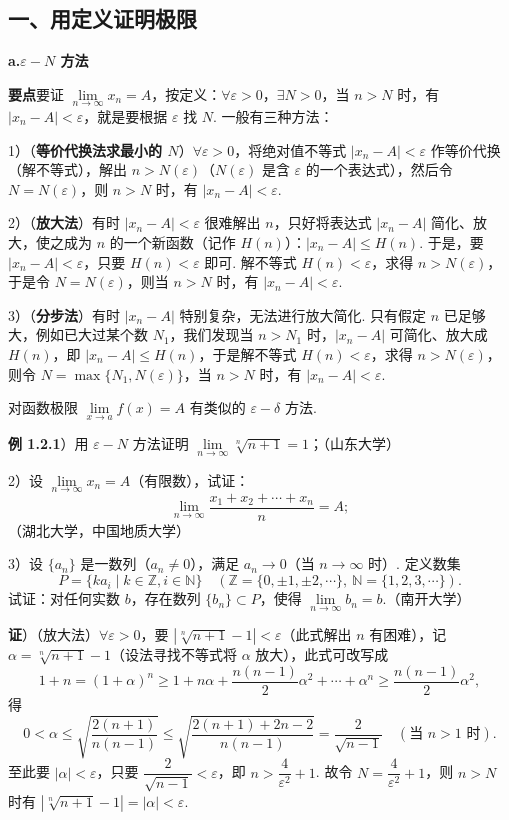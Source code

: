 \documentclass[UTF8,12pt,a4paper,fontset=fandol]{ctexart}
\begin{document}
\subsection*{一、用定义证明极限}

\noindent\textbf{a.\quad $\varepsilon-N$ 方法}

\noindent\textbf{要点}\quad 要证 $\lim\limits_{n\to\infty}x_n=A$，按定义：$\forall\varepsilon>0$，$\exists N>0$，当 $n>N$ 时，有 $|x_n-A|<\varepsilon$，就是要根据 $\varepsilon$ 找 $N$. 一般有三种方法：

1）（\textbf{等价代换法求最小的 $N$}）$\forall\varepsilon>0$，将绝对值不等式 $|x_n-A|<\varepsilon$ 作等价代换（解不等式），解出 $n>N(\varepsilon)$（$N(\varepsilon)$ 是含 $\varepsilon$ 的一个表达式），然后令 $N=N(\varepsilon)$，则 $n>N$ 时，有 $|x_n-A|<\varepsilon$.

2）（\textbf{放大法}）有时 $|x_n-A|<\varepsilon$ 很难解出 $n$，只好将表达式 $|x_n-A|$ 简化、放大，使之成为 $n$ 的一个新函数（记作 $H(n)$）：$|x_n-A|\le H(n)$. 于是，要 $|x_n-A|<\varepsilon$，只要 $H(n)<\varepsilon$ 即可. 解不等式 $H(n)<\varepsilon$，求得 $n>N(\varepsilon)$，于是令 $N=N(\varepsilon)$，则当 $n>N$ 时，有 $|x_n-A|<\varepsilon$.

3）（\textbf{分步法}）有时 $|x_n-A|$ 特别复杂，无法进行放大简化. 只有假定 $n$ 已足够大，例如已大过某个数 $N_1$，我们发现当 $n>N_1$ 时，$|x_n-A|$ 可简化、放大成 $H(n)$，即 $|x_n-A|\le H(n)$，于是解不等式 $H(n)<\varepsilon$，求得 $n>N(\varepsilon)$，则令 $N=\max\{N_1,N(\varepsilon)\}$，当 $n>N$ 时，有 $|x_n-A|<\varepsilon$.

对函数极限 $\lim\limits_{x\to a}f(x)=A$ 有类似的 $\varepsilon-\delta$ 方法.

\noindent\textbf{例 1.2.1}）用 $\varepsilon-N$ 方法证明 $\lim\limits_{n\to\infty}\sqrt[n]{n+1}=1$；（山东大学）

2）设 $\lim\limits_{n\to\infty}x_n=A$（有限数），试证：
\[
  \lim_{n\to\infty}\frac{x_1+x_2+\cdots+x_n}{n}=A;
\]
（湖北大学，中国地质大学）

3）设 $\{a_n\}$ 是一数列（$a_n\ne0$），满足 $a_n\to0$（当 $n\to\infty$ 时）. 定义数集
\[
  P=\{ka_i\mid k\in\mathbb{Z}, i\in\mathbb{N}\}
  \quad(\mathbb{Z}=\{0,\pm1,\pm2,\cdots\},\ \mathbb{N}=\{1,2,3,\cdots\}).
\]
试证：对任何实数 $b$，存在数列 $\{b_n\}\subset P$，使得 $\lim\limits_{n\to\infty}b_n=b$.（南开大学）

\noindent\textbf{证}）（放大法）$\forall\varepsilon>0$，要 $|\sqrt[n]{n+1}-1|<\varepsilon$（此式解出 $n$ 有困难），记 $\alpha=\sqrt[n]{n+1}-1$（设法寻找不等式将 $\alpha$ 放大），此式可改写成
\[
  1+n=(1+\alpha)^n\ge 1+n\alpha+\frac{n(n-1)}2\alpha^2+\cdots+\alpha^n
  \ge \frac{n(n-1)}2\alpha^2,
\]
得
\[
  0<\alpha\le \sqrt{\frac{2(n+1)}{n(n-1)}}
  \le \sqrt{\frac{2(n+1)+2n-2}{n(n-1)}}=\frac2{\sqrt{n-1}}\quad(\text{当 }n>1\text{ 时}).
\]
至此要 $|\alpha|<\varepsilon$，只要 $\dfrac2{\sqrt{n-1}}<\varepsilon$，即 $n>\dfrac4{\varepsilon^2}+1$. 故令 $N=\dfrac4{\varepsilon^2}+1$，则 $n>N$ 时有 $|\sqrt[n]{n+1}-1|=|\alpha|<\varepsilon$.
\end{document}
